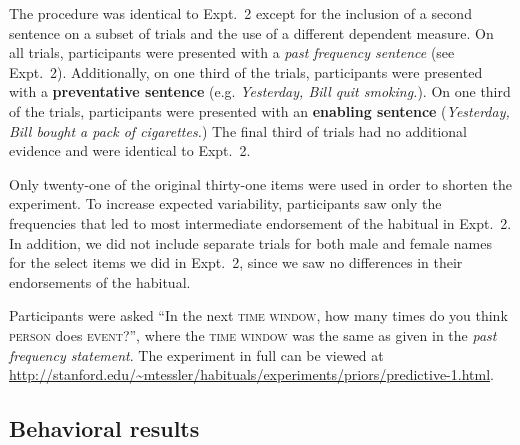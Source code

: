 \documentclass[10pt,letterpaper]{article}
\begin{document}
The procedure was identical to Expt.~2 except for the inclusion of a second sentence on a subset of trials and the use of a different dependent measure. 
On all trials, participants were presented with a \emph{past frequency sentence} (see Expt.~2).
Additionally, on one third of the trials, participants were presented with a \textbf{preventative sentence} (e.g. \emph{Yesterday, Bill quit smoking.}). %
On one third of the trials, participants were presented with an \textbf{enabling sentence} (\emph{Yesterday, Bill bought a pack of cigarettes.}) %
The final third of trials had no additional evidence and were identical to Expt.~2. 

Only twenty-one of the original thirty-one items were used in order to shorten the experiment.
To increase expected variability, participants saw only the frequencies that led to most intermediate endorsement of the habitual in Expt.~2. 
In addition, we did not include separate trials for both male and female names for the select items we did in Expt.~2, since we saw no differences in their endorsements of the habitual.

Participants were asked ``In the next \textsc{time window}, how many times do you think \textsc{person} does \textsc{event}?'', where the \textsc{time window} was the same as given in the \emph{past frequency statement}.
The experiment in full can be viewed at \url{http://stanford.edu/~mtessler/habituals/experiments/priors/predictive-1.html}.



\subsection{Behavioral results}
\end{document}
